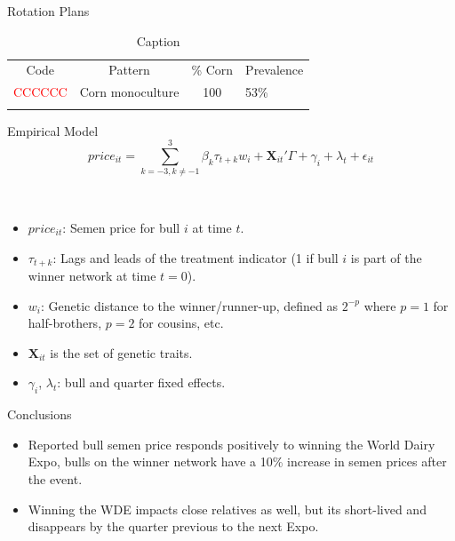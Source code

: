 \documentclass[final]{beamer}
\newlength{\onecolwid}
\begin{document}
\begin{frame}[t]
\begin{columns}[t]
\begin{column}{\onecolwid}
\begin{block}{Rotation Plans}

\begin{table}
    \centering
    \begin{tabular}{ccc}
        Code & Pattern  & \% Corn & Prevalence\\
       \textcolor{red}{CCCCCC}  & Corn monoculture & 100 & 53\%\\
        \twxtcolor{}{} &  & \\
    \end{tabular}
    \caption{Caption}
    \label{tab:placeholder}
\end{table}
\vspace{1.2cm}
\end{block}	

\begin{block}{Empirical Model}
\begin{equation*}
price_{it} = \sum_{k=-3,k\neq -1}^{3}\beta_{k}\tau_{t+k}w_{i}+\mathbf{X}_{it}'\Gamma+\gamma_{i}+\lambda_{t}+\epsilon_{it}
\end{equation*}

\quad \\

\vspace{-1cm}
\begin{itemize}
\item $price_{it}$: Semen price for bull $i$ at time $t$.
\item $\tau_{t+k}$: Lags and leads of the treatment indicator (1 if bull $i$ is part of the winner network at time $t=0$).
\item $w_{i}$: Genetic distance to the winner/runner-up, defined as $2^{-p}$ where $p=1$ for half-brothers, $p=2$ for cousins, etc. 
\item $\mathbf{X}_{it}$ is the set of genetic traits.
\item $\gamma_{i}$, $\lambda_{t}$: bull and quarter fixed effects.
\end{itemize}


\end{block}

\begin{block}{Conclusions}
\begin{itemize}
\item Reported bull semen price responds positively to winning the World Dairy Expo, bulls on the winner network have a 10\% increase in semen prices after the event.
\item Winning the WDE impacts close relatives as well, but its short-lived and disappears by the quarter previous to the next Expo.
\end{itemize}
\quad\\
\quad\\
\end{block}


\end{column}
\end{columns}
\end{frame}
\end{document}
